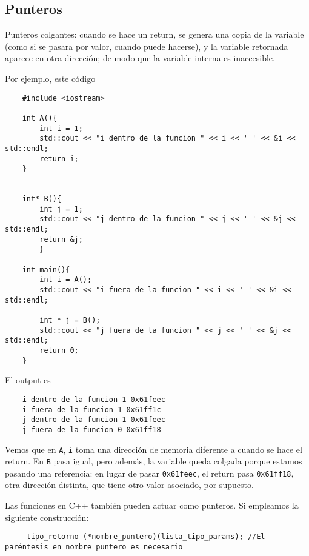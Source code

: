 \documentclass[a4paper]{article}
\begin{document}
	 \subsection{Punteros}
	 Punteros colgantes: cuando se hace un return, se genera una copia de la variable (como si se pasara por valor, cuando puede hacerse), y la variable retornada aparece en otra dirección; de modo que la variable interna es inaccesible.
	 
	Por ejemplo, este código
	
	\begin{lstlisting}
	#include <iostream>
	
	int A(){
		int i = 1;
		std::cout << "i dentro de la funcion " << i << ' ' << &i << std::endl;
		return i;
	}
	
	
	int* B(){
		int j = 1;
		std::cout << "j dentro de la funcion " << j << ' ' << &j << std::endl;
		return &j;
		}
	
	int main(){
		int i = A();
		std::cout << "i fuera de la funcion " << i << ' ' << &i << std::endl;
		
		int * j = B();
		std::cout << "j fuera de la funcion " << j << ' ' << &j << std::endl;
		return 0;
	}
	\end{lstlisting}
	 
	El output es 
	
	\begin{verbatim}
	i dentro de la funcion 1 0x61feec                                                                                       
	i fuera de la funcion 1 0x61ff1c                                                                                        
	j dentro de la funcion 1 0x61feec                                                                                       
	j fuera de la funcion 0 0x61ff18 
	\end{verbatim}
	 
	 Vemos que en \verb|A|, \verb|i| toma una dirección de memoria diferente a cuando se hace el return. En \verb|B| pasa igual, pero además, la variable queda colgada porque estamos pasando una referencia: en lugar de pasar \verb|0x61feec|, el return pasa \verb|0x61ff18|, otra dirección distinta, que tiene otro valor asociado, por supuesto.
	 
	 Las funciones en C++ también pueden actuar como punteros. Si empleamos la siguiente construcción:
	 \begin{verbatim}
	 tipo_retorno (*nombre_puntero)(lista_tipo_params); //El paréntesis en nombre puntero es necesario
	 \end{verbatim}
	 
\end{document}
